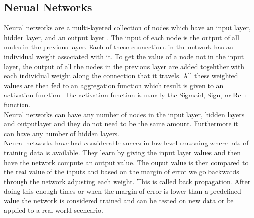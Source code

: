 \subsection{Nerual Networks}
Neural networks are a multi-layered collection of nodes which have an input layer, hidden layer, and an output layer \cite{AI-book}.
The input of each node is the output of all nodes in the previous layer.
Each of these connections in the network has an individual weight associated with it.
To get the value of a node not in the input layer, the output of all the nodes in the previous layer are added togehther with each individual weight along the connection that it travels.
All these weighted values are then fed to an aggregation function which result is given to an activation function.
The activation function is usually the Sigmoid, Sign, or Relu function.
\\
Neural networks can have any number of nodes in the input layer, hidden layers and outputlayer and they do not need to be the same amount.
Furthermore it can have any number of hidden layers.
\\
Neural networks have had considerable succes in low-level reasoning where lots of training data is available.
They learn by giving the input layer values and then have the network compute an output value.
The ouput value is then compared to the real value of the inputs and based on the margin of error we go backwards through the network adjusting each weight.
This is called back propagation.
After doing this enough times or when the margin of error is lower than a predefined value the network is considered trained and can be tested on new data or be applied to a real world sceneario.
